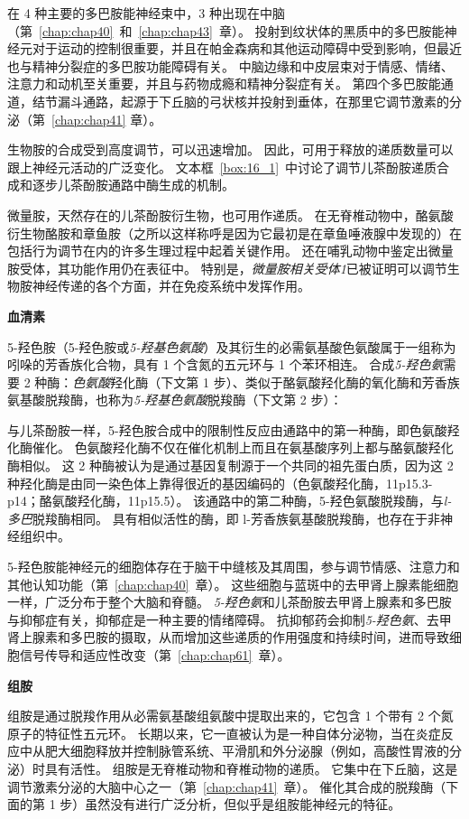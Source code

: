 在 4 种主要的多巴胺能神经束中，3 种出现在中脑（第~\ref{chap:chap40}~和~\ref{chap:chap43}~章）。
投射到纹状体的黑质中的多巴胺能神经元对于运动的控制很重要，并且在帕金森病和其他运动障碍中受到影响，但最近也与精神分裂症的多巴胺功能障碍有关。
中脑边缘和中皮层束对于情感、情绪、注意力和动机至关重要，并且与药物成瘾和精神分裂症有关。
第四个多巴胺能通道，结节漏斗通路，起源于下丘脑的弓状核并投射到垂体，在那里它调节激素的分泌（第~\ref{chap:chap41} 章）。


生物胺的合成受到高度调节，可以迅速增加。
因此，可用于释放的递质数量可以跟上神经元活动的广泛变化。
文本框~\ref{box:16_1}~中讨论了调节儿茶酚胺递质合成和逐步儿茶酚胺通路中酶生成的机制。


微量胺，天然存在的儿茶酚胺衍生物，也可用作递质。
在无脊椎动物中，酪氨酸衍生物酪胺和章鱼胺（之所以这样称呼是因为它最初是在章鱼唾液腺中发现的）在包括行为调节在内的许多生理过程中起着关键作用。
还在哺乳动物中鉴定出微量胺受体，其功能作用仍在表征中。
特别是，\textit{微量胺相关受体1}已被证明可以调节生物胺神经传递的各个方面，并在免疫系统中发挥作用。


\textbf{血清素}

5-羟色胺（5-羟色胺或\textit{5-羟基色氨酸}）及其衍生的必需氨基酸色氨酸属于一组称为吲哚的芳香族化合物，具有 1 个含氮的五元环与 1 个苯环相连。
合成\textit{5-羟色氨}需要 2 种酶：\textit{色氨酸}羟化酶（下文第 1 步）、类似于酪氨酸羟化酶的氧化酶和芳香族氨基酸脱羧酶，也称为\textit{5-羟基色氨酸}脱羧酶（下文第 2 步）：


与儿茶酚胺一样，5-羟色胺合成中的限制性反应由通路中的第一种酶，即色氨酸羟化酶催化。
色氨酸羟化酶不仅在催化机制上而且在氨基酸序列上都与酪氨酸羟化酶相似。
这 2 种酶被认为是通过基因复制源于一个共同的祖先蛋白质，因为这 2 种羟化酶是由同一染色体上靠得很近的基因编码的（色氨酸羟化酶，11p15.3-p14；酪氨酸羟化酶，11p15.5）。
该通路中的第二种酶，5-羟色氨酸脱羧酶，与\textit{l-多巴}脱羧酶相同。
具有相似活性的酶，即 l-芳香族氨基酸脱羧酶，也存在于非神经组织中。


5-羟色胺能神经元的细胞体存在于脑干中缝核及其周围，参与调节情感、注意力和其他认知功能（第~\ref{chap:chap40}~章）。
这些细胞与蓝斑中的去甲肾上腺素能细胞一样，广泛分布于整个大脑和脊髓。
\textit{5-羟色氨}和儿茶酚胺去甲肾上腺素和多巴胺与抑郁症有关，抑郁症是一种主要的情绪障碍。
抗抑郁药会抑制\textit{5-羟色氨}、去甲肾上腺素和多巴胺的摄取，从而增加这些递质的作用强度和持续时间，进而导致细胞信号传导和适应性改变（第~\ref{chap:chap61}~章）。


\textbf{组胺}

组胺是通过脱羧作用从必需氨基酸组氨酸中提取出来的，它包含 1 个带有 2 个氮原子的特征性五元环。
长期以来，它一直被认为是一种自体分泌物，当在炎症反应中从肥大细胞释放并控制脉管系统、平滑肌和外分泌腺（例如，高酸性胃液的分泌）时具有活性。
组胺是无脊椎动物和脊椎动物的递质。
它集中在下丘脑，这是调节激素分泌的大脑中心之一（第~\ref{chap:chap41}~章）。
催化其合成的脱羧酶（下面的第 1 步）虽然没有进行广泛分析，但似乎是组胺能神经元的特征。


